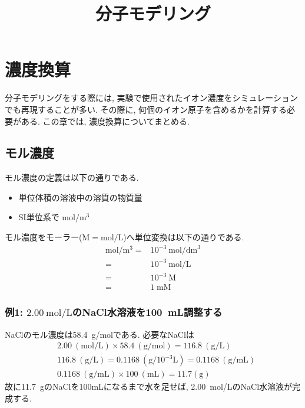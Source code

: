 





\title{分子モデリング}
\maketitle

\section{濃度換算}
分子モデリングをする際には, 実験で使用されたイオン濃度をシミュレーションでも再現することが多い. 
その際に, 何個のイオン原子を含めるかを計算する必要がある. 
この章では, 濃度換算についてまとめる. 


\subsection{モル濃度}

モル濃度の定義は以下の通りである. 
\begin{itemize}
    \item 単位体積の溶液中の溶質の物質量
    \item SI単位系で $\mathrm{mol}/\mathrm{m}^{3}$
\end{itemize}

モル濃度をモーラー($\mathrm{M} = \mathrm{mol}/\mathrm{L}$)へ単位変換は以下の通りである. 
\begin{align}
    \mathrm{mol}/\mathrm{m}^{3} =&
    10^{-3} ~\mathrm{mol} / \mathrm{dm}^{3} \\ =&
    10^{-3} ~\mathrm{mol} / \mathrm{L} \\ =&
    10^{-3} ~\mathrm{M} \\ =&
    1 ~\mathrm{mM}
\end{align}


\subsubsection{例1: $2.00~\mathrm{mol/L}$のNaCl水溶液を100~mL調整する}
NaClのモル濃度は58.4~g/molである. 
必要なNaClは
\begin{align}
    &2.00~(\mathrm{mol/L}) \times 58.4~(\mathrm{g/mol}) = 116.8~(\mathrm{g/L}) \\
    &116.8~(\mathrm{g/L}) = 0.1168~(\mathrm{g/}10^{-3}\mathrm{L}) = 0.1168~(\mathrm{g/mL}) \\
    &0.1168~(\mathrm{g/mL}) \times 100~(\mathrm{mL}) = 11.7 (\mathrm{g})
\end{align}
故に11.7~gのNaClを100mLになるまで水を足せば, 2.00~mol/LのNaCl水溶液が完成する. 


